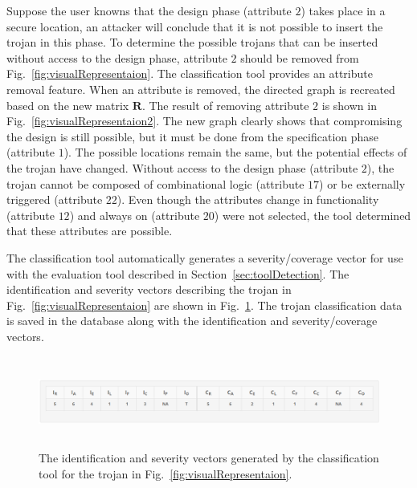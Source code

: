 Suppose the user knowns that the design phase (attribute $2$) takes place in a secure location, an attacker will conclude that it is not possible to insert the trojan in this phase.
To determine the possible trojans that can be inserted without access to the design phase,
attribute $2$ should be removed from Fig.~\ref{fig:visualRepresentaion}.
The classification tool provides an attribute removal feature.
When an attribute is removed, the directed graph is recreated based on the new matrix $\mathbf{R}$.
The result of removing attribute $2$ is shown in Fig.~\ref{fig:visualRepresentaion2}.
The new graph clearly shows that compromising the design is still possible, but it must be done from the specification phase (attribute $1$).
The possible locations remain the same, but the potential effects of the trojan have changed.
Without access to the design phase (attribute $2$), the trojan cannot be composed of combinational logic (attribute $17$) or be externally triggered (attribute $22$).
Even though the attributes change in functionality (attribute $12$) and always on (attribute $20$) were not selected,
the tool determined that these attributes are possible.

The classification tool automatically generates a severity/coverage vector for use with the evaluation tool described in Section~\ref{sec:toolDetection}.
The identification and severity vectors describing the trojan in Fig.~\ref{fig:visualRepresentaion} are shown in Fig.~\ref{fig:classificationSeverity}.
The trojan classification data is saved in the database along with the identification and severity/coverage vectors.
\begin{figure}[h]
	\centering
	\includegraphics[width=1\linewidth, height = 3cm]{figures/classificationSeverity}
	\caption{The identification and severity vectors generated by the classification tool for the trojan in Fig.~\ref{fig:visualRepresentaion}.}
	\label{fig:classificationSeverity}
\end{figure}

